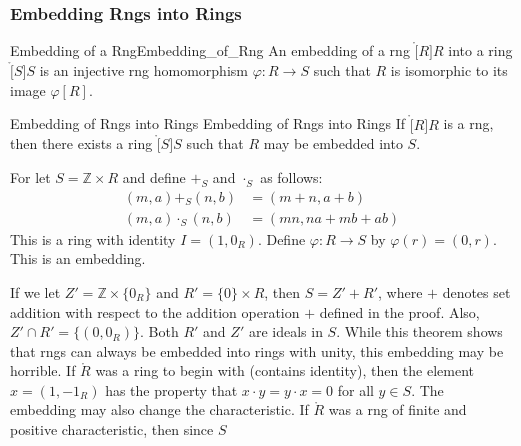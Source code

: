 \documentclass{article}                                                        %
\begin{document}
            \subsubsection{Embedding Rngs into Rings}
                \begin{fdefinition}{Embedding of a Rng}{Embedding_of_Rng}
                    An embedding of a rng $\ring[R]{R}$ into a ring
                    $\ring[S]{S}$ is an injective rng homomorphism
                    $\varphi:R\rightarrow{S}$ such that $R$ is isomorphic to its
                    image $\varphi[R]$.
                \end{fdefinition}
                \begin{ftheorem}{Embedding of Rngs into Rings}
                                {Embedding of Rngs into Rings}
                    If $\ring[R]{R}$ is a rng, then there exists a ring
                    $\ring[S]{S}$ such that $R$ may be embedded into $S$.
                \end{ftheorem}
                \begin{bproof}
                    For let $S=\mathbb{Z}\times{R}$ and define $+_{S}$ and
                    $\cdot_{S}$ as follows:
                    \begin{align}
                        (m,a)+_{S}(n,b)&=(m+n,a+b)\\
                        (m,a)\cdot_{S}(n,b)&=(mn,na+mb+ab)
                    \end{align}
                    This is a ring with identity $I=(1,0_{R})$. Define
                    $\varphi:R\rightarrow{S}$ by $\varphi(r)=(0,r)$. This is an
                    embedding.
                \end{bproof}
                If we let $Z'=\mathbb{Z}\times\{0_{R}\}$ and
                $R'=\{0\}\times{R}$, then $S=Z'+R'$, where $+$ denotes set
                addition with respect to the addition operation $+$ defined in
                the proof. Also, $Z'\cap{R}'=\{(0,0_{R})\}$. Both $R'$ and $Z'$
                are ideals in $S$. While this theorem shows that rngs can always
                be embedded into rings with unity, this embedding may be
                horrible. If $\ring{R}$ was a ring to begin with (contains
                identity), then the element $x=(1,\minus{1}_{R})$ has the
                property that $x\cdot{y}=y\cdot{x}=0$ for all $y\in{S}$. The
                embedding may also change the characteristic. If $\ring{R}$ was
                a rng of finite and positive characteristic, then since $S$
\end{document}
